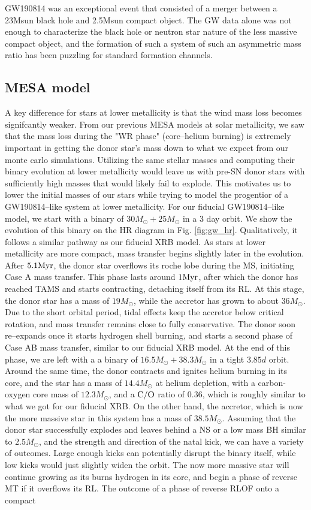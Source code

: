\documentclass[linenumbers,trackchanges,twocolumn]{aastex701}
\newcommand{\Mdot}{M_{\odot}}
\begin{document}
GW190814 was an exceptional event that consisted of a merger between a 23Msun black hole and 2.5Msun compact object. The GW data alone was not enough to characterize the black hole or neutron star nature of the less massive compact object, and the formation of such a system of such an asymmetric mass ratio has been puzzling for standard formation channels. 

\subsection{MESA model}

A key difference for stars at lower metallicity is that the wind mass loss becomes signifcantly weaker. From our previous MESA models at solar metallicity, we saw that the mass loss during the "WR phase" (core--helium burning) is extremely important in getting the donor star's mass down to what we expect from our monte carlo simulations. Utilizing the same stellar masses and computing their binary evolution at lower metallicity would leave us with pre-SN donor stars with sufficiently high masses that would likely fail to explode. This motivates us to lower the initial masses of our stars while trying to model the progentior of a GW190814--like system at lower metallicity. For our fiducial GW190814--like model, we start with a binary of $30M_{\odot}+25M_{\odot}$ in a 3 day orbit. We show the evolution of this binary on the HR diagram in Fig. \ref{fig:gw_hr}. Qualitatively, it follows a similar pathway as our fiducial XRB model. As stars at lower metallicity are more compact, mass transfer begins slightly later in the evolution. After $5.1 \rm Myr$, the donor star overflows its roche lobe during the MS, initiating Case A mass transfer. This phase lasts around $1 \rm Myr$, after which the donor has reached TAMS and starts contracting, detaching itself from its RL. At this stage, the donor star has a mass of $19M_{\odot}$, while the accretor has grown to about $36\Mdot$. Due to the short orbital period, tidal effects keep the accretor below critical rotation, and mass transfer remains close to fully conservative. The donor soon re--expands once it starts hydrogen shell burning, and starts a second phase of Case AB mass transfer, similar to our fiducial XRB model. At the end of this phase, we are left with a a binary of $16.5\Mdot+38.3\Mdot$ in a tight $3.85d$ orbit. Around the same time, the donor contracts and ignites helium burning in its core, and the star has a mass of $14.4\Mdot$ at helium depletion, with a carbon-oxygen core mass of $12.3\Mdot$, and a $\rm C/O$ ratio of $0.36$, which is roughly similar to what we got for our fiducial XRB. On the other hand, the accretor, which is now the more massive star in this system has a mass of $38.5\Mdot$. Assuming that the donor star successfully explodes and leaves behind a NS or a low mass BH similar to $2.5M_{\odot}$, and the strength and direction of the natal kick, we can have a variety of outcomes. Large enough kicks can potentially disrupt the binary itself, while low kicks would just slightly widen the orbit. The now more massive star will continue growing as its burns hydrogen in its core, and begin a phase of reverse MT if it overflows its RL. The outcome of a phase of reverse RLOF onto a compact 
\end{document}
